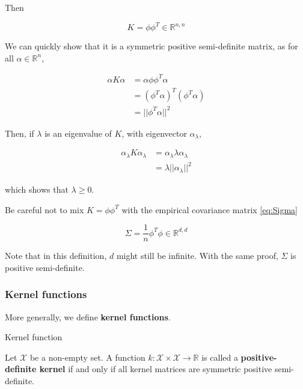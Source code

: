 \documentclass[
10pt, %
a4paper, %
oneside, %
headinclude,footinclude, %
BCOR5mm, %
]{scrartcl}
\begin{document}
Then

\begin{equation}
    K = \phi \phi^T\in \mathbb{R}^{n, n}
\end{equation}

We can quickly show that it is a symmetric positive semi-definite matrix, as for all $\alpha\in \mathbb{R}^n$, 

\begin{equation}
    \begin{aligned}
        \label{eq:}
	\alpha K \alpha &= \alpha \phi \phi^T \alpha \\
	&= ( \phi^T \alpha)^T ( \phi^T \alpha)\\
	&= ||\phi^T \alpha||^2
    \end{aligned}
\end{equation}

Then, if $\lambda$ is an eigenvalue of $ K$, with eigenvector $\alpha_{\lambda}$, 

\begin{equation}
    \begin{aligned}
        \label{eq:}
	\alpha_{\lambda} K \alpha_{\lambda} &= \alpha_{\lambda} \lambda \alpha_{\lambda}\\
	&= \lambda ||\alpha_{\lambda}||^2
    \end{aligned}
\end{equation}

which shows that $\lambda\geq 0$.

Be careful not to mix $K = \phi \phi^T$ with the empirical covariance matrix \ref{eq:Sigma}

\begin{equation}
    \Sigma = \frac{1}{n}\phi^T \phi\in \mathbb{R}^{d, d}
\end{equation}

Note that in this definition, $d$ might still be infinite. With the same proof, $ \Sigma$ is positive semi-definite.

\subsubsection{\large\color{Periwinkle}Kernel functions}

More generally, we define \textbf{{kernel functions}}.

\begin{definition}{Kernel function}

    Let $ \mathcal{X} $ be a non-empty set. A function $k: \mathcal{X} \times \mathcal{X} \rightarrow \mathbb{R}$ is called a \textbf{{positive-definite kernel}} if and only if all kernel matrices are symmetric positive semi-definite.

\end{definition}
\end{document}
